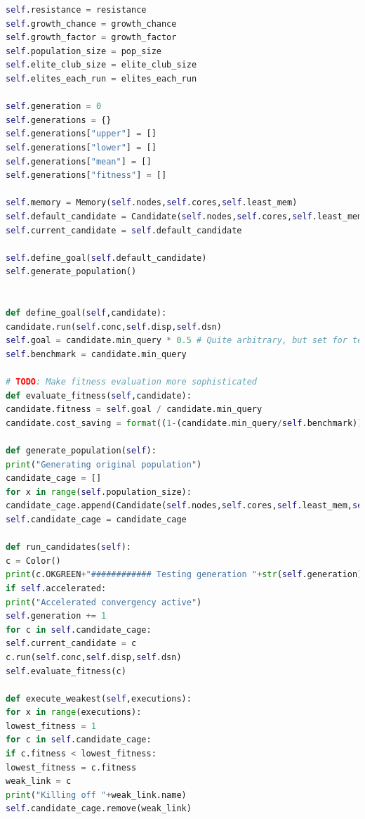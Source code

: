 \documentclass[a4paper,english]{report}
\begin{document}
\begin{lstlisting}[language=Python, caption=class\_definition.py\, the file defining all the algorithmic operations done during a optimization process.]
self.resistance = resistance
self.growth_chance = growth_chance
self.growth_factor = growth_factor
self.population_size = pop_size
self.elite_club_size = elite_club_size
self.elites_each_run = elites_each_run

self.generation = 0
self.generations = {}
self.generations["upper"] = []
self.generations["lower"] = []
self.generations["mean"] = []
self.generations["fitness"] = []

self.memory = Memory(self.nodes,self.cores,self.least_mem)
self.default_candidate = Candidate(self.nodes,self.cores,self.least_mem,self.memory,name="Default candidate",default=True) 
self.current_candidate = self.default_candidate

self.define_goal(self.default_candidate)
self.generate_population()


def define_goal(self,candidate):
candidate.run(self.conc,self.disp,self.dsn)
self.goal = candidate.min_query * 0.5 # Quite arbitrary, but set for testing purposes?
self.benchmark = candidate.min_query

# TODO: Make fitness evaluation more sophisticated
def evaluate_fitness(self,candidate):
candidate.fitness = self.goal / candidate.min_query
candidate.cost_saving = format((1-(candidate.min_query/self.benchmark))*100,'.2f')

def generate_population(self):
print("Generating original population")
candidate_cage = []
for x in range(self.population_size):
candidate_cage.append(Candidate(self.nodes,self.cores,self.least_mem,self.memory,name="Candidate "+str(self.generation)+"."+str(x))) 
self.candidate_cage = candidate_cage

def run_candidates(self):
c = Color()
print(c.OKGREEN+"############ Testing generation "+str(self.generation)+" ############"+c.ENDC)
if self.accelerated:
print("Accelerated convergency active")
self.generation += 1
for c in self.candidate_cage:
self.current_candidate = c
c.run(self.conc,self.disp,self.dsn)
self.evaluate_fitness(c)

def execute_weakest(self,executions):
for x in range(executions):
lowest_fitness = 1
for c in self.candidate_cage:
if c.fitness < lowest_fitness:
lowest_fitness = c.fitness
weak_link = c
print("Killing off "+weak_link.name)
self.candidate_cage.remove(weak_link)


\end{lstlisting}
\end{document}
